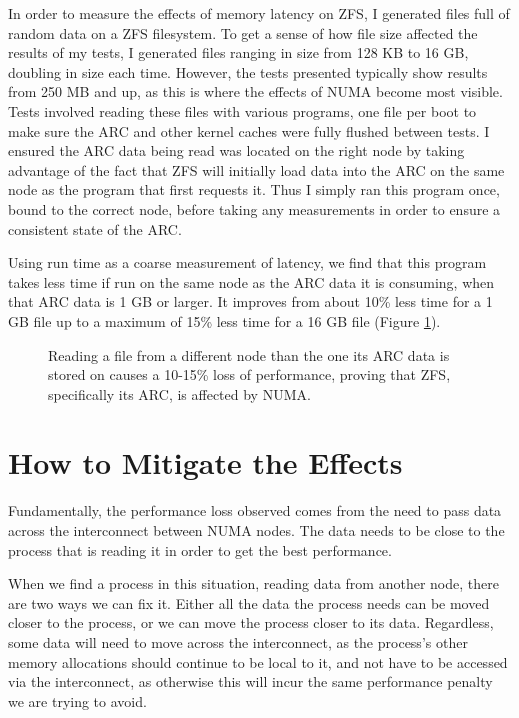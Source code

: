 In order to measure the effects of memory latency on ZFS, I generated files full of random data on a ZFS filesystem.
To get a sense of how file size affected the results of my tests,
I generated files ranging in size from 128 KB to 16 GB, doubling in size each time.
However, the tests presented typically show results from 250 MB and up, as this is where the effects of NUMA become most visible.
Tests involved reading these files with various programs, one file per boot to make sure the ARC and other kernel caches were fully flushed between tests.
I ensured the ARC data being read was located on the
right node by taking advantage of the fact that ZFS will initially load data into the ARC on the same node as the program that first requests it.
Thus I simply ran this program once, bound to the correct node, before taking any measurements in order to ensure a consistent state of the ARC.

Using run time as a coarse measurement of latency, we find that this program takes less time if run on the same node as the ARC data it is consuming, when that ARC data is 1 GB or larger.
It improves from about 10\% less time for a 1 GB file up to a maximum of 15\% less time for a 16 GB file
(Figure \ref{fig:OldZFS}).

\begin{figure}[H]
    \centering
    \captionsetup{width=0.75\linewidth}
    \resizebox{0.75\linewidth}{!}{}
    \caption{Reading a file from a different node than the one its ARC data is stored on causes a 10-15\% loss of 
        performance, proving that ZFS, specifically its ARC, is affected by NUMA.}
    \label{fig:OldZFS}
\end{figure}

\section{How to Mitigate the Effects}
Fundamentally, the performance loss observed comes from the need to pass data across the interconnect between NUMA nodes.
The data needs to be close to the process that is reading it in order to get the best performance.

When we find a process in this situation, reading data from another node, there are two ways we can fix it.
Either all the data the process needs can be moved closer to the process, or we can move the process closer to its data.
Regardless, some data will need to move across the interconnect, as the process's other memory allocations should continue to be local to it, 
and not have to be accessed via the interconnect, as otherwise this will incur the same performance penalty we are trying to avoid.

